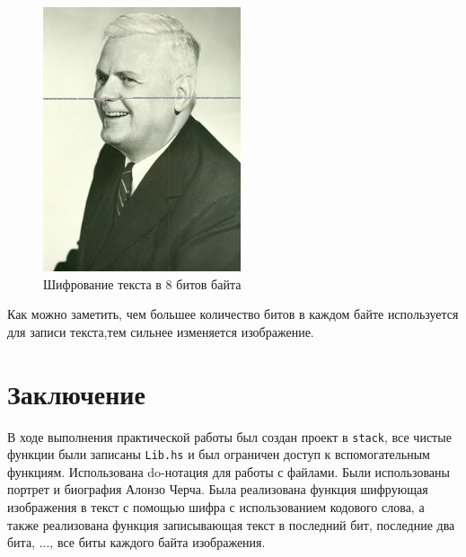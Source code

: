 \documentclass[10pt,a4paper,final]{article} %
\begin{document}
\begin{figure}[h!]
\begin{minipage}{0.3\textwidth}
		\includegraphics[width=\linewidth]{img/Haskell_8 (1)}
		\caption{Шифрование текста в 8 битов байта}
	\end{minipage}
\end{figure}

Как можно заметить, чем большее количество битов в каждом байте используется для записи текста,тем сильнее изменяется изображение.

\newpage

\section* {Заключение}
В ходе выполнения практической работы был создан проект в \texttt{stack}, все чистые функции были записаны \texttt{Lib.hs} и был ограничен доступ к вспомогательным функциям. Использована do-нотация для работы с файлами. Были использованы портрет и биография Алонзо Черча. Была реализована функция шифрующая изображения в текст с помощью шифра с использованием кодового слова, а также реализована функция записывающая текст в последний бит, последние два бита, ..., все биты каждого байта изображения.
\end{document}
